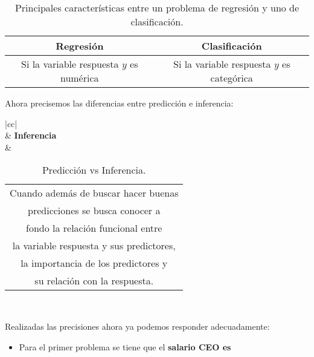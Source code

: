 \documentclass[a4paper,11pt]{article}
\begin{document}
\begin{enumerate}
{\begin{shaded}
\begin{table}[H]
\begin{tabular}{|cc|}
                \multicolumn{1}{|c|}{\textbf{Regresión}} &
                \textbf{Clasificación} \\ \hline
                \multicolumn{1}{|c|}{Si la variable respuesta $y$ es numérica}
                & Si la variable respuesta $y$ es categórica \\ \hline
            \end{tabular}
            \caption{Principales características entre un problema de regresión
            y uno de clasificación.}
        \end{table}
        Ahora precisemos las diferencias entre predicción e inferencia:
        \begin{table}[H]
            \centering
            \begin{tabular}{|cc|}
            \hline
            \\ \hline
             & \textbf{Inferencia}\\
            \hline
             & 
            \begin{tabular}[c]{@{}c@{}}Cuando además de buscar hacer buenas\\
            predicciones se busca conocer a\\ 
            fondo la relación funcional entre\\ la variable respuesta y sus
            predictores,\\ la importancia de los predictores y\\ su relación con
            la respuesta. \end{tabular} \\ \hline
            \end{tabular}
            \caption{Predicción vs Inferencia.}
        \end{table}
        Realizadas las precisiones ahora ya podemos responder adecuadamente:
        \begin{itemize}
            \item Para el primer problema se tiene que el \textbf{salario CEO es
}
\end{itemize}
\end{shaded}}
\end{enumerate}
\end{document}
